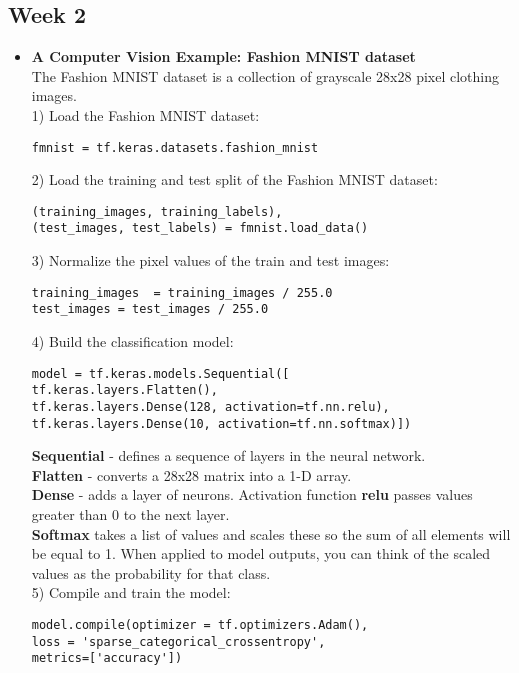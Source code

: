 \documentclass[20pt]{article}
\begin{document}
	\subsection{Week 2}
	\begin{itemize}
		\item \textbf{A Computer Vision Example: Fashion MNIST dataset}
		\\
		The Fashion MNIST dataset is a collection of grayscale 28x28 pixel clothing images.
		\\
		1) Load the Fashion MNIST dataset:
		\begin{verbatim}
fmnist = tf.keras.datasets.fashion_mnist
		\end{verbatim}
		2) Load the training and test split of the Fashion MNIST dataset:
		\begin{verbatim}
(training_images, training_labels), 
(test_images, test_labels) = fmnist.load_data()
		\end{verbatim}
		3) Normalize the pixel values of the train and test images:
		\begin{verbatim}
training_images  = training_images / 255.0
test_images = test_images / 255.0
		\end{verbatim}
		4) Build the classification model:
		\begin{verbatim}
model = tf.keras.models.Sequential([
tf.keras.layers.Flatten(), 
tf.keras.layers.Dense(128, activation=tf.nn.relu), 
tf.keras.layers.Dense(10, activation=tf.nn.softmax)])
		\end{verbatim}
		\textbf{Sequential} - defines a sequence of layers in the neural network.\\ \textbf{Flatten} - converts a 28x28 matrix into a 1-D array.\\ \textbf{Dense} - adds a layer of neurons.  
		Activation function \textbf{relu} passes values greater than 0 to the next layer.\\ \textbf{Softmax} takes a list of values and scales these so the sum of all elements will be equal to 1. When applied to model outputs, you can think of the scaled values as the probability for that class.
		\\
		5) Compile and train the model:
		\begin{verbatim}
model.compile(optimizer = tf.optimizers.Adam(),
loss = 'sparse_categorical_crossentropy',
metrics=['accuracy'])


\end{verbatim}
\end{itemize}
\end{document}

